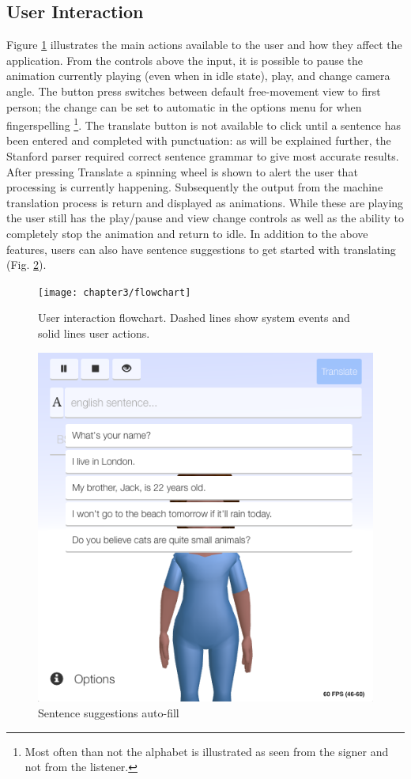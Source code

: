 \documentclass[12pt]{ociamthesis}  %
\begin{document}
\subsection{User Interaction}
Figure \ref{fig:flow} illustrates the main actions available to the user and how they affect the application. From the controls above the input, it is possible to pause the animation currently playing (even when in idle state), play, and change camera angle. The button press switches between default free-movement view to first person; the change can be set to automatic in the options menu for when fingerspelling \footnote{Most often than not the alphabet is illustrated as seen from the signer and not from the listener.}. The translate button is not available to click until a sentence has been entered and completed with punctuation: as will be explained further, the Stanford parser required correct sentence grammar to give most accurate results. After pressing Translate a spinning wheel is shown to alert the user that processing is currently happening. Subsequently the output from the machine translation process is return and displayed as animations. While these are playing the user still has the play/pause and view change controls as well as the ability to completely stop the animation and return to idle. 
In addition to the above features, users can also have sentence suggestions to get started with translating (Fig. \ref{fig:suggestions}). 
\begin{figure}[h]
	\centering
    \texttt{[image: chapter3/flowchart]}
    \caption[User interaction flowchart]{User interaction flowchart. Dashed lines show system events and solid lines user actions.}
    \label{fig:flow}
\end{figure}
\begin{figure}[h]
	\centering
    \includegraphics[scale=0.4]{chapter3/suggestions}
    \caption{Sentence suggestions auto-fill}
    \label{fig:suggestions}
\end{figure}
\end{document}
